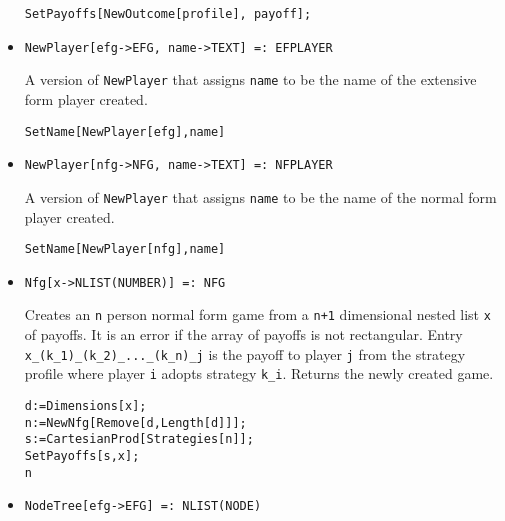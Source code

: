 \begin{itemize}
\begin{verbatim}
SetPayoffs[NewOutcome[profile], payoff];
\end{verbatim} 
\ed


\item{}
\protect \large \begin{verbatim}
NewPlayer[efg->EFG, name->TEXT] =: EFPLAYER 
\end{verbatim}\normalsize

\bd 
A version of \verb+NewPlayer+ that assigns \verb+name+ to be the name
of the extensive form player created.  
\begin{verbatim}
SetName[NewPlayer[efg],name]
\end{verbatim} 
\ed

\item{}
\protect \large \begin{verbatim}
NewPlayer[nfg->NFG, name->TEXT] =: NFPLAYER 
\end{verbatim}\normalsize

\bd 
A version of \verb+NewPlayer+ that assigns \verb+name+ to be the name
of the normal form player created.  
\begin{verbatim}
SetName[NewPlayer[nfg],name]
\end{verbatim} 
\ed

\item{}
\protect \large \begin{verbatim}
Nfg[x->NLIST(NUMBER)] =: NFG 
\end{verbatim}\normalsize

\bd 

Creates an \verb+n+ person normal form game from a \verb&n+1&
dimensional nested list \verb+x+ of payoffs.  It is an error if the
array of payoffs is not rectangular.  Entry
\verb+x_(k_1)_(k_2)_..._(k_n)_j+ is the payoff to player \verb+j+ from
the strategy profile where player \verb+i+ adopts strategy \verb+k_i+.
Returns the newly created game.

\begin{verbatim}
d:=Dimensions[x];
n:=NewNfg[Remove[d,Length[d]]];
s:=CartesianProd[Strategies[n]];
SetPayoffs[s,x];
n
\end{verbatim} 
\ed

\item{}
\protect \large \begin{verbatim}
NodeTree[efg->EFG] =: NLIST(NODE) 
\end{verbatim}\normalsize


\end{itemize}
